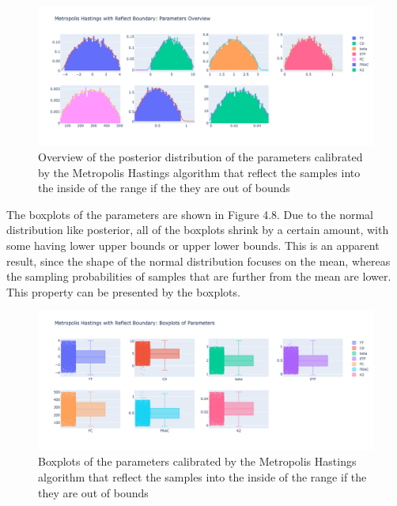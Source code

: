 \begin{figure}[H]
    \centering
    \includegraphics[width=1\textwidth]{figures/basic_mh/rb_mh/rb_mh_parameters_overview.png}
    \captionsetup{width=.8\textwidth}
    \caption{Overview of the posterior distribution of the parameters calibrated by the Metropolis Hastings algorithm that reflect the samples into the inside of the range if the they are out of bounds}
    \label{fig:enter-label}
\end{figure}

The boxplots of the parameters are shown in Figure 4.8. Due to the normal distribution like posterior, all of the boxplots shrink by a certain amount, with some having lower upper bounds or upper lower bounds. This is an apparent result, since the shape of the normal distribution focuses on the mean, whereas the sampling probabilities of samples that are further from the mean are lower. This property can be presented by the boxplots.

\begin{figure}[H]
    \centering
    \includegraphics[width=1\textwidth]{figures/basic_mh/rb_mh/rb_mh_boxplot.png}
    \captionsetup{width=.8\textwidth}
    \caption{Boxplots of the parameters calibrated by the Metropolis Hastings algorithm that reflect the samples into the inside of the range if the they are out of bounds}
    \label{fig:enter-label}
\end{figure}



